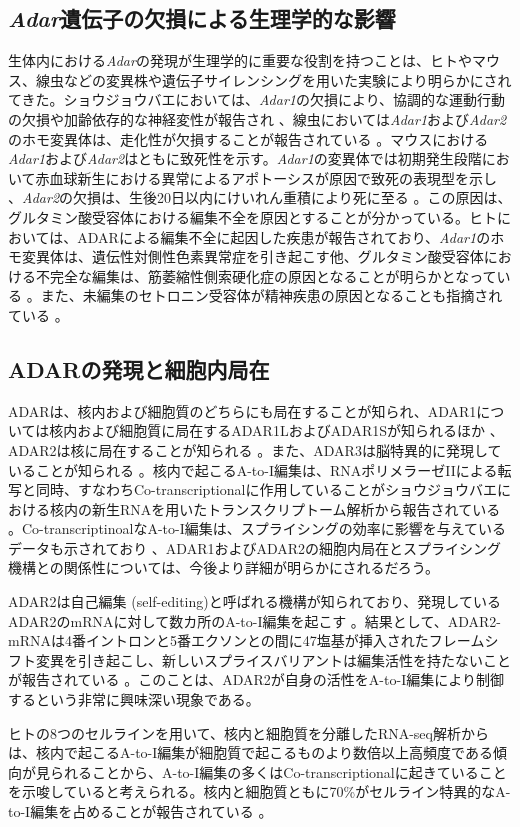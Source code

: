 \subsection{\textit{Adar}遺伝子の欠損による生理学的な影響}
生体内における\textit{Adar}の発現が生理学的に重要な役割を持つことは、ヒトやマウス、線虫などの変異株や遺伝子サイレンシングを用いた実験により明らかにされてきた。ショウジョウバエにおいては、\textit{Adar1}の欠損により、協調的な運動行動の欠損や加齢依存的な神経変性が報告され \citep{PalKeeOCo0008}、線虫においては\textit{Adar1}および\textit{Adar2}のホモ変異体は、走化性が欠損することが報告されている \citep{TonSacMor0211}。マウスにおける\textit{Adar1}および\textit{Adar2}はともに致死性を示す。\textit{Adar1}の変異体では初期発生段階において赤血球新生における異常によるアポトーシスが原因で致死の表現型を示し \citep{HarWalLu0901}、\textit{Adar2}の欠損は、生後20日以内にけいれん重積により死に至る \citep{HigMaaSin0007}。この原因は、グルタミン酸受容体における編集不全を原因とすることが分かっている。ヒトにおいては、ADARによる編集不全に起因した疾患が報告されており、\textit{Adar1}のホモ変異体は、遺伝性対側性色素異常症を引き起こす他、グルタミン酸受容体における不完全な編集は、筋萎縮性側索硬化症の原因となることが明らかとなっている \citep{MiySuzKon0309}。また、未編集のセトロニン受容体が精神疾患の原因となることも指摘されている \citep{Slotkin:2013aa}。

\subsection{ADARの発現と細胞内局在}
ADARは、核内および細胞質のどちらにも局在することが知られ、ADAR1については核内および細胞質に局在するADAR1LおよびADAR1Sが知られるほか \citep{PatSam9510}、ADAR2は核に局在することが知られる \citep{DesKeeLaf0305}。また、ADAR3は脳特異的に発現していることが知られる \citep{MelMaaHer9612}。核内で起こるA-to-I編集は、RNAポリメラーゼIIによる転写と同時、すなわちCo-transcriptionalに作用していることがショウジョウバエにおける核内の新生RNAを用いたトランスクリプトーム解析から報告されている \citep{Rodriguez:2012aa}。Co-transcriptinoalなA-to-I編集は、スプライシングの効率に影響を与えているデータも示されており \citep{Laurencikiene:2006aa}、ADAR1およびADAR2の細胞内局在とスプライシング機構との関係性については、今後より詳細が明らかにされるだろう。
\par
ADAR2は自己編集 (self-editing)と呼ばれる機構が知られており、発現しているADAR2のmRNAに対して数カ所のA-to-I編集を起こす \citep{GanZhaYan0611}。結果として、ADAR2-mRNAは4番イントロンと5番エクソンとの間に47塩基が挿入されたフレームシフト変異を引き起こし、新しいスプライスバリアントは編集活性を持たないことが報告されている \citep{HanTohMat0808}。このことは、ADAR2が自身の活性をA-to-I編集により制御するという非常に興味深い現象である。
\par
ヒトの8つのセルラインを用いて、核内と細胞質を分離したRNA-seq解析からは、核内で起こるA-to-I編集が細胞質で起こるものより数倍以上高頻度である傾向が見られることから、A-to-I編集の多くはCo-transcriptionalに起きていることを示唆していると考えられる。核内と細胞質ともに70\%がセルライン特異的なA-to-I編集を占めることが報告されている \citep{Che1307}。

